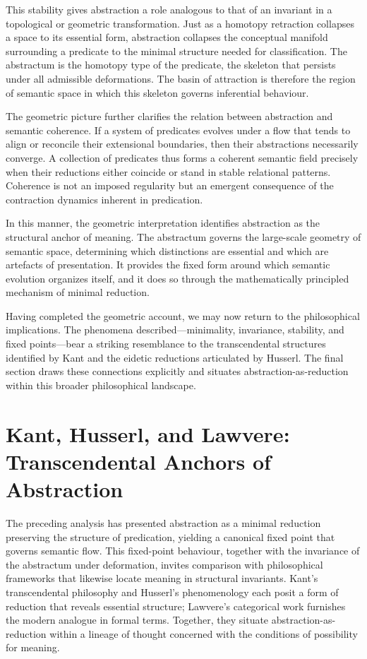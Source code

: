 \documentclass[12pt,letterpaper]{article}
\begin{document}
This stability gives abstraction a role analogous to that of an invariant in a topological or geometric transformation. Just as a homotopy retraction collapses a space to its essential form, abstraction collapses the conceptual manifold surrounding a predicate to the minimal structure needed for classification. The abstractum is the homotopy type of the predicate, the skeleton that persists under all admissible deformations. The basin of attraction is therefore the region of semantic space in which this skeleton governs inferential behaviour.

The geometric picture further clarifies the relation between abstraction and semantic coherence. If a system of predicates evolves under a flow that tends to align or reconcile their extensional boundaries, then their abstractions necessarily converge. A collection of predicates thus forms a coherent semantic field precisely when their reductions either coincide or stand in stable relational patterns. Coherence is not an imposed regularity but an emergent consequence of the contraction dynamics inherent in predication.

In this manner, the geometric interpretation identifies abstraction as the structural anchor of meaning. The abstractum governs the large-scale geometry of semantic space, determining which distinctions are essential and which are artefacts of presentation. It provides the fixed form around which semantic evolution organizes itself, and it does so through the mathematically principled mechanism of minimal reduction.

Having completed the geometric account, we may now return to the philosophical implications. The phenomena described—minimality, invariance, stability, and fixed points—bear a striking resemblance to the transcendental structures identified by Kant and the eidetic reductions articulated by Husserl. The final section draws these connections explicitly and situates abstraction-as-reduction within this broader philosophical landscape.

\section{Kant, Husserl, and Lawvere: Transcendental Anchors of Abstraction}

The preceding analysis has presented abstraction as a minimal reduction preserving the structure of predication, yielding a canonical fixed point that governs semantic flow. This fixed-point behaviour, together with the invariance of the abstractum under deformation, invites comparison with philosophical frameworks that likewise locate meaning in structural invariants. Kant’s transcendental philosophy and Husserl’s phenomenology each posit a form of reduction that reveals essential structure; Lawvere’s categorical work furnishes the modern analogue in formal terms. Together, they situate abstraction-as-reduction within a lineage of thought concerned with the conditions of possibility for meaning.
\end{document}
